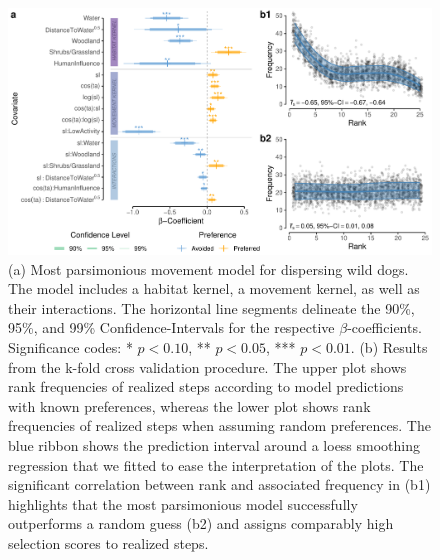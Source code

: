 \documentclass[abstract=on,10pt,a4paper,bibliography=totocnumbered]{article}
\begin{document}
\begin{figure}
  \begin{center}
    \includegraphics[width=\textwidth]{99_MovementModel}
    \caption{(a) Most parsimonious movement model for dispersing wild dogs. The
    model includes a habitat kernel, a movement kernel, as well as their
    interactions. The horizontal line segments delineate the 90\%, 95\%, and
    99\% Confidence-Intervals for the respective \(\beta\)-coefficients.
    Significance codes: * \(p < 0.10\), ** \(p < 0.05\), *** \(p < 0.01\). (b)
    Results from the k-fold cross validation procedure. The upper plot shows
    rank frequencies of realized steps according to model predictions with known
    preferences, whereas the lower plot shows rank frequencies of realized steps
    when assuming random preferences. The blue ribbon shows the prediction
    interval around a loess smoothing regression that we fitted to ease the
    interpretation of the plots. The significant correlation between rank and
    associated frequency in (b1) highlights that the most parsimonious model
    successfully outperforms a random guess (b2) and assigns comparably high
    selection scores to realized steps.}
    \label{MovementModel}
  \end{center}
\end{figure}
\end{document}
